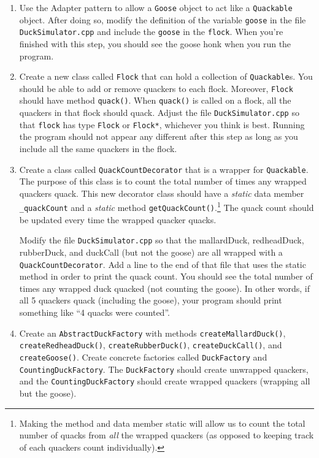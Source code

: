 \documentclass[11pt]{article}
\newlength{\up}\setlength{\up}{-\baselineskip}
\begin{document}
\begin{enumerate}

  \item[Step 1.] Use the Adapter pattern to allow a \texttt{Goose} object to act like a \texttt{Quackable} object. After doing so, modify the definition of the variable \texttt{goose} in the file \texttt{DuckSimulator.cpp} and include the \texttt{goose} in the \texttt{flock}. When you're finished with this step, you should see the goose honk when you run the program.

  \item[Step 2.] Create a new class called \texttt{Flock} that can hold a collection of \texttt{Quackable}s. You should be able to add or remove quackers to each flock. Moreover, \texttt{Flock} should have method \texttt{quack()}. When \texttt{quack()} is called on a flock, all the quackers in that flock should quack. Adjust the file \texttt{DuckSimulator.cpp} so that \texttt{flock} has type \texttt{Flock} or \texttt{Flock*}, whichever you think is best. Running the program should not appear any different after this step as long as you include all the same quackers in the flock.

  \item[Step 3.] Create a class called \texttt{QuackCountDecorator} that is a wrapper for \texttt{Quackable}. The purpose of this class is to count the total number of times any wrapped quackers quack. This new decorator class should have a \emph{static} data member \texttt{\_quackCount} and a \emph{static} method \texttt{getQuackCount()}.\footnote{Making the method and data member static will allow us to count the total number of quacks from \emph{all} the wrapped quackers (as opposed to keeping track of each quackers count individually).} The quack count should be updated every time the wrapped quacker quacks. 

  Modify the file \texttt{DuckSimulator.cpp} so that the mallardDuck, redheadDuck, rubberDuck, and duckCall (but not the goose) are all wrapped with a \texttt{QuackCountDecorator}. Add a line to the end of that file that uses the static method in order to print the quack count. You should see the total number of times any wrapped duck quacked (not counting the goose). In other words, if all 5 quackers quack (including the goose), your program should print something like ``4 quacks were counted''.

  \item[Step 4.] Create an \texttt{AbstractDuckFactory} with methods 
  \texttt{createMallardDuck()}, 
  \texttt{createRedheadDuck()}, 
  \texttt{createRubberDuck()}, 
  \texttt{createDuckCall()}, and
  \texttt{createGoose()}. Create concrete factories called \texttt{DuckFactory} and \texttt{CountingDuckFactory}. The \texttt{DuckFactory} should create unwrapped quackers, and the \texttt{CountingDuckFactory} should create wrapped quackers (wrapping all but the goose). 


\end{enumerate}
\end{document}
